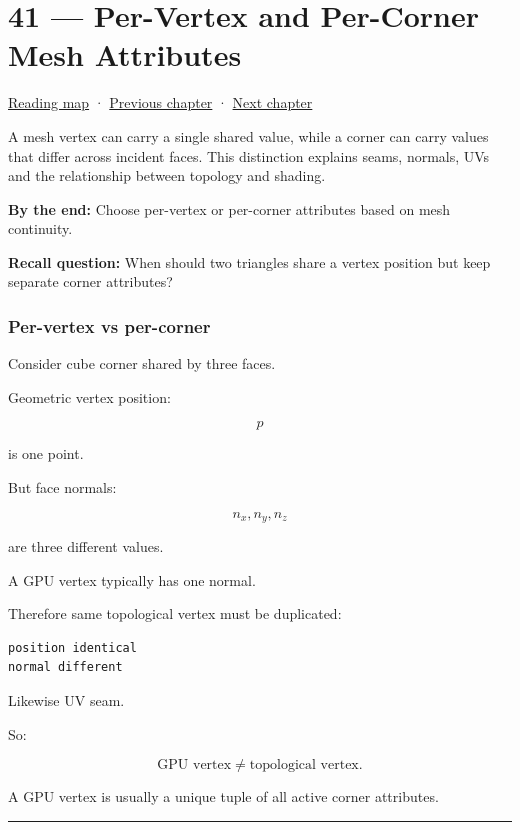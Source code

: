 \hypertarget{04-visual-computing-ii-ch041}{}
\chapter{41 --- Per-Vertex and Per-Corner Mesh Attributes}\label{04-visual-computing-ii-ch041-per-vertex-and-per-corner-mesh-attributes}

\hyperref[volume-reading-map]{Reading map} · \hyperref[04-visual-computing-ii-ch040]{Previous chapter} · \hyperref[04-visual-computing-ii-ch042]{Next chapter}

A mesh vertex can carry a single shared value, while a corner can carry values that differ across incident faces. This distinction explains seams, normals, UVs and the relationship between topology and shading.

\textbf{By the end:} Choose per-vertex or per-corner attributes based on mesh continuity.

\textbf{Recall question:} When should two triangles share a vertex position but keep separate corner attributes?

\subsection{Per-vertex vs per-corner}\label{04-visual-computing-ii-ch041-per-vertex-vs-per-corner}

Consider cube corner shared by three faces.

Geometric vertex position:

\[
p
\]

is one point.

But face normals:

\[
n_x,n_y,n_z
\]

are three different values.

A GPU vertex typically has one normal.

Therefore same topological vertex must be duplicated:

\begin{verbatim}
position identical
normal different
\end{verbatim}

Likewise UV seam.

So:

\[
\boxed{
\text{GPU vertex}
\neq
\text{topological vertex}.
}
\]

A GPU vertex is usually a unique tuple of all active corner attributes.

\begin{center}\rule{0.5\linewidth}{0.5pt}\end{center}


